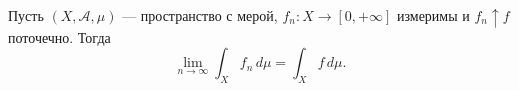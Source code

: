 \label{ticket:35}

\begin{theorem}
Пусть $(X,\mathcal A,\mu)$ --- пространство с мерой, $f_n:X\to[0,+\infty]$ измеримы и $f_n\uparrow f$ поточечно.
Тогда
\[
  \lim_{n\to\infty}\int_X f_n\,d\mu=\int_X f\,d\mu.
\]
\end{theorem}


